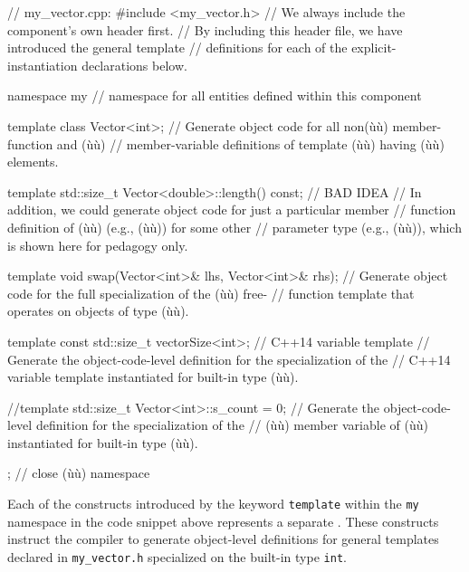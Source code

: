 \begin{emcppslisting}[emcppsbatch=e1,emcppsstandards=c++14]
// my_vector.cpp:
#include <my_vector.h>  // We always include the component's own header first.
    // By including this header file, we have introduced the general template
    // definitions for each of the explicit-instantiation declarations below.

namespace my  // namespace for all entities defined within this component
{

template class Vector<int>;
    // Generate object code for all non(ù{}ù) member-function and (ù{}ù)
    // member-variable definitions of template (ù{}ù) having (ù{}ù) elements.

template std::size_t Vector<double>::length() const;  // BAD IDEA
    // In addition, we could generate object code for just a particular member
    // function definition of (ù{}ù) (e.g., (ù{}ù)) for some other
    // parameter type (e.g., (ù{}ù)), which is shown here for pedagogy only.

template void swap(Vector<int>& lhs, Vector<int>& rhs);
    // Generate object code for the full specialization of the (ù{}ù) free-
    // function template that operates on objects of type (ù{}ù).

template const std::size_t vectorSize<int>;  // C++14 variable template
    // Generate the object-code-level definition for the specialization of the
    // C++14 variable template instantiated for built-in type (ù{}ù).

//template std::size_t Vector<int>::s_count = 0;
    // Generate the object-code-level definition for the specialization of the
    // (ù{}ù) member variable of (ù{}ù) instantiated for built-in type (ù{}ù).

}; // close (ù{}ù) namespace
\end{emcppslisting}

\noindent Each of the constructs introduced by the keyword \lstinline!template!
within the \lstinline!my! namespace in the code snippet above represents a
separate . These
constructs instruct the compiler to generate object-level definitions
for general templates declared in \lstinline!my_vector.h! specialized on
the built-in type \lstinline!int!.

